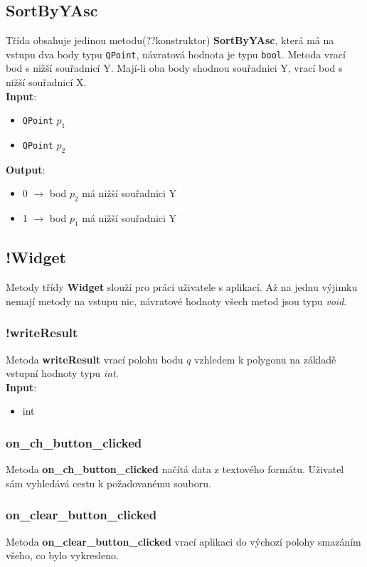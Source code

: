 \documentclass[a4paper, 12pt]{article}
\begin{document}
\subsection{SortByYAsc}
Třída obsahuje jedinou metodu(??konstruktor) \textbf{SortByYAsc}, která má na vstupu dva body typu \texttt{QPoint}, návratová hodnota je typu \texttt{bool}. Metoda vrací bod s nižší  souřadnicí Y. Mají-li oba body shodnou souřadnici Y, vrací bod s nižší souřadnicí X.\\

\textbf{Input}:
\begin{itemize}
\item \texttt{QPoint} $p_1$
\item \texttt{QPoint} $p_2$
\end{itemize}

\textbf{Output}:
\begin{itemize}
\item 0 $\rightarrow$ bod $p_2$ má nižší souřadnici Y
\item 1 $\rightarrow$ bod $p_1$ má nižší souřadnici Y
\end{itemize}

\subsection{!Widget}
Metody třídy \textbf{Widget} slouží pro práci uživatele s aplikací. Až na jednu výjimku nemají metody na vstupu nic, návratové hodnoty všech metod jsou typu \textit{void}.

\subsubsection{!writeResult}
Metoda \textbf{writeResult} vrací polohu bodu $q$ vzhledem k polygonu na základě vstupní hodnoty typu \textit{int}.\\

\textbf{Input}:
\begin{itemize}
\item int
\end{itemize}

\subsubsection{on\_ch\_button\_clicked}
Metoda \textbf{on\_ch\_button\_clicked} načítá data z textového formátu. Uživatel sám vyhledává cestu k požadovanému souboru.

\subsubsection{on\_clear\_button\_clicked}
Metoda \textbf{on\_clear\_button\_clicked} vrací aplikaci do výchozí polohy smazáním všeho, co bylo vykresleno. 
\end{document}
